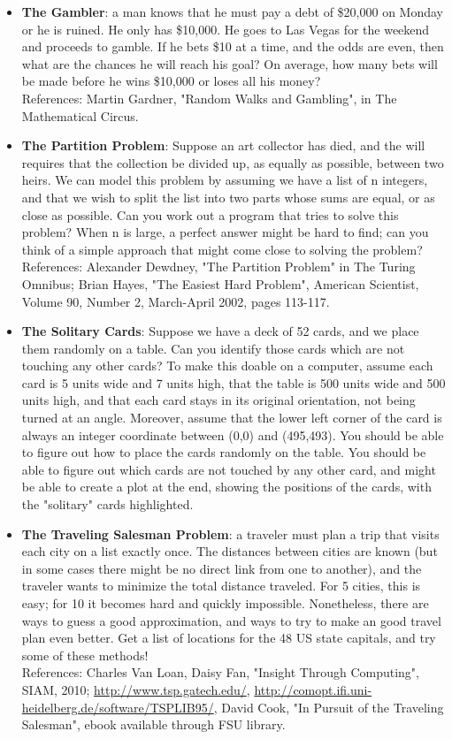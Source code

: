 \documentclass{article}
\begin{document}
\begin{itemize}
    \item \textbf{The Gambler}: a man knows that he must pay a debt of \$20,000 on Monday or he is ruined. He only has \$10,000. He goes to Las Vegas for the weekend and proceeds to gamble. If he bets \$10 at a time, and the odds are even, then what are the chances he will reach his goal? On average, how many bets will be made before he wins \$10,000 or loses all his money? \\
    References: Martin Gardner, "Random Walks and Gambling", in The Mathematical Circus.
    
    \item \textbf{The Partition Problem}: Suppose an art collector has died, and the will requires that the collection be divided up, as equally as possible, between two heirs. We can model this problem by assuming we have a list of n integers, and that we wish to split the list into two parts whose sums are equal, or as close as possible. Can you work out a program that tries to solve this problem? When n is large, a perfect answer might be hard to find; can you think of a simple approach that might come close to solving the problem? \\
    References: Alexander Dewdney, "The Partition Problem" in The Turing Omnibus; Brian Hayes, "The Easiest Hard Problem", American Scientist, Volume 90, Number 2, March-April 2002, pages 113-117.
    
    \item \textbf{The Solitary Cards}: Suppose we have a deck of 52 cards, and we place them randomly on a table. Can you identify those cards which are not touching any other cards? To make this doable on a computer, assume each card is 5 units wide and 7 units high, that the table is 500 units wide and 500 units high, and that each card stays in its original orientation, not being turned at an angle. Moreover, assume that the lower left corner of the card is always an integer coordinate between (0,0) and (495,493). You should be able to figure out how to place the cards randomly on the table. You should be able to figure out which cards are not touched by any other card, and might be able to create a plot at the end, showing the positions of the cards, with the "solitary" cards highlighted.
    
    \item \textbf{The Traveling Salesman Problem}: a traveler must plan a trip that visits each city on a list exactly once. The distances between cities are known (but in some cases there might be no direct link from one to another), and the traveler wants to minimize the total distance traveled. For 5 cities, this is easy; for 10 it becomes hard and quickly impossible. Nonetheless, there are ways to guess a good approximation, and ways to try to make an good travel plan even better. Get a list of locations for the 48 US state capitals, and try some of these methods! \\
    References: Charles Van Loan, Daisy Fan, "Insight Through Computing", SIAM, 2010; \url{http://www.tsp.gatech.edu/}, \url{http://comopt.ifi.uni-heidelberg.de/software/TSPLIB95/}, David Cook, "In Pursuit of the Traveling Salesman", ebook available through FSU library.

\end{itemize}
\end{document}
